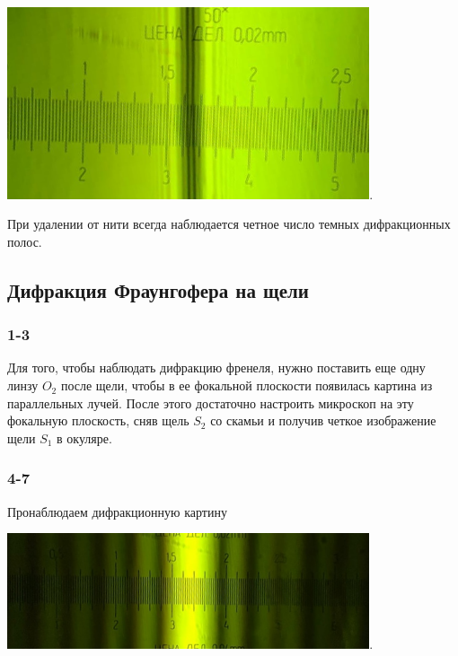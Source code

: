 \documentclass[a4paper, 12pt]{article}%
\begin{document}
\begin{center}
\includegraphics[width=0.80\textwidth]{6.png}.\\
\end{center}

При удалении от нити всегда наблюдается четное число темных дифракционных полос.

\subsection{Дифракция Фраунгофера на щели}

\subsubsection*{1-3}
Для того, чтобы наблюдать дифракцию френеля, нужно поставить еще одну линзу $O_2$ после щели, чтобы в ее фокальной плоскости появилась картина из параллельных лучей. После этого достаточно настроить микроскоп на эту фокальную плоскость, сняв щель $S_2$ со скамьи и получив четкое изображение щели $S_1$ в окуляре.
\subsubsection*{4-7}
Пронаблюдаем дифракционную картину
\begin{center}
\includegraphics[width=0.80\textwidth]{7.png}.\\
\end{center}
\end{document}
